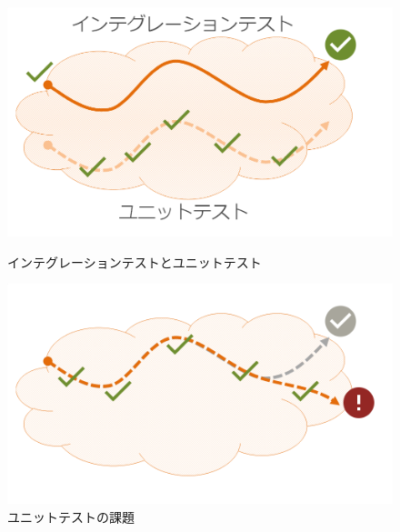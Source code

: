 \begin{figure}[h]
 \centering
 \begin{minipage}[c]{0.45\columnwidth}
  \centering
  \includegraphics[width=\columnwidth]{img/test-difference.png}
  \caption{インテグレーションテストとユニットテスト}
  \label{fig:test-difference}
 \end{minipage}
 \begin{minipage}[c]{0.45\columnwidth}
  \centering
  \includegraphics[width=\columnwidth]{img/test-difference2.png}
  \caption{ユニットテストの課題}
  \label{fig:test-difference2}
 \end{minipage}
\end{figure}


